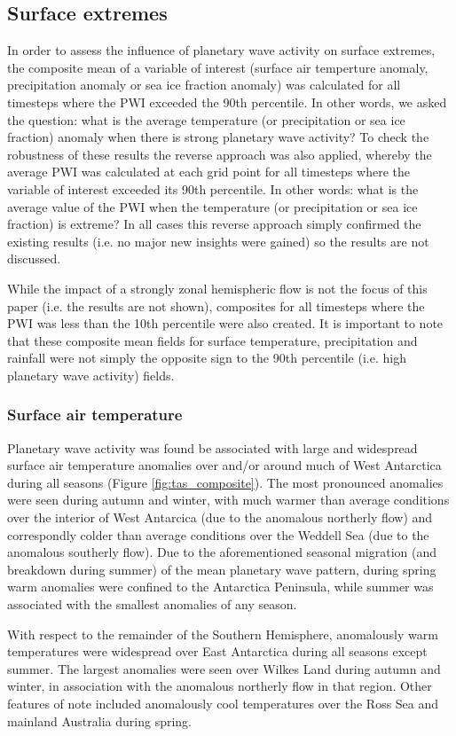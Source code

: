 \subsection{Surface extremes}

In order to assess the influence of planetary wave activity on surface extremes, the composite mean of a variable of interest (surface air temperture anomaly, precipitation anomaly or sea ice fraction anomaly) was calculated for all timesteps where the PWI exceeded the 90th percentile. In other words, we asked the question: what is the average temperature (or precipitation or sea ice fraction) anomaly when there is strong planetary wave activity? To check the robustness of these results the reverse approach was also applied, whereby the average PWI was calculated at each grid point for all timesteps where the variable of interest exceeded its 90th percentile. In other words: what is the average value of the PWI when the temperature (or precipitation or sea ice fraction) is extreme? In all cases this reverse approach simply confirmed the existing results (i.e. no major new insights were gained) so the results are not discussed.

While the impact of a strongly zonal hemispheric flow is not the focus of this paper (i.e. the results are not shown), composites for all timesteps where the PWI was less than the 10th percentile were also created. It is important to note that these composite mean fields for surface temperature, precipitation and rainfall were not simply the opposite sign to the 90th percentile (i.e. high planetary wave activity) fields. 


\subsubsection{Surface air temperature}

Planetary wave activity was found be associated with large and widespread surface air temperature anomalies over and/or around much of West Antarctica during all seasons (Figure \ref{fig:tas_composite}). The most pronounced anomalies were seen during autumn and winter, with much warmer than average conditions over the interior of West Antarcica (due to the anomalous northerly flow) and correspondly colder than average conditions over the Weddell Sea (due to the anomalous southerly flow). Due to the aforementioned seasonal migration (and breakdown during summer) of the mean planetary wave pattern, during spring warm anomalies were confined to the Antarctica Peninsula, while summer was associated with the smallest anomalies of any season.  

With respect to the remainder of the Southern Hemisphere, anomalously warm temperatures were widespread over East Antarctica during all seasons except summer. The largest anomalies were seen over Wilkes Land during autumn and winter, in association with the anomalous northerly flow in that region. Other features of note included anomalously cool temperatures over the Ross Sea and mainland Australia during spring.

